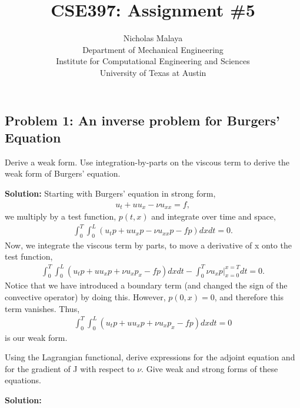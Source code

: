 \documentclass[11pt]{article}
\newenvironment{solution}{\begin{trivlist}\item[]{\bf Solution:}}
                      {\end{trivlist}}
\begin{document}
\title{\bf{CSE397: Assignment \#5}}
\author{Nicholas Malaya \\ Department of Mechanical Engineering \\
Institute for Computational Engineering and Sciences \\ University of
Texas at Austin} \date{} 
\maketitle
\newpage

\subsection*{Problem 1: An inverse problem for Burgers' Equation}

\begin{enumerate}
\item[(1)] Derive a weak form. Use integration-by-parts on the viscous
	   term to derive the weak form of Burgers' equation. 

\begin{solution}
Starting with Burgers' equation in strong form, 
\begin{align}
 u_t + u u_x - \nu u_{xx} = f, 
\end{align}
we multiply by a test function, $p(t,x)$ and integrate over time and space, 
\begin{align}
 \int_0^T \int_0^L (u_t p + u u_x p - \nu u_{xx} p - f p) dx dt = 0. 
\end{align}
Now, we integrate the viscous term by parts, to move a derivative of x
 onto the test function, 
\begin{align}
 \int_0^T \int_0^L (u_t p + u u_x p + \nu u_{x} p_x - f p) dx dt -
 \int_0^T \nu u_x p \bigg|_{x=0}^{x=T} dt = 0. 
\end{align}
Notice that we have introduced a boundary term (and changed the sign of
 the convective operator) by doing this. However,
 $p(0,x)=0$, and therefore this term vanishes. Thus, 
\begin{align}
 \int_0^T \int_0^L (u_t p + u u_x p + \nu u_{x} p_x - f p) dx dt = 0
\end{align}
is our weak form.  
\end{solution}

\item[(2)] Using the Lagrangian functional, derive expressions for the
	   adjoint equation and for the gradient of J with respect to
	   $\nu$. Give weak and strong forms of these equations. 
\begin{solution}


\end{solution}
\end{enumerate}
\end{document}
